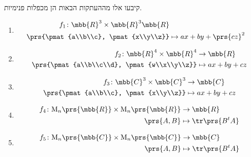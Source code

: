 \documentclass[a4paper,10pt,twoside,openany]{book}
\renewcommand{\Mat}{\mathrm{M}}
\begin{document}
\begin{exercisechap}
קיבעו אלו מההעתקות הבאות הן מכפלות פנימיות.

\begin{enumerate}
\item
\begin{align*}
f_1 \colon \mbb{R}^3 \times \mbb{R}^3 \mbb{R} \\
\prs{\pmat{a\\b\\c}, \pmat{x\\y\\z}} &\mapsto ax + by + \prs{cz}^2
\end{align*}

\item
\begin{align*}
f_2 \colon \mbb{R}^4 \times \mbb{R}^4 &\to \mbb{R} \\
\prs{\pmat{a\\b\\c\\d}, \pmat{w\\x\\y\\z}} &\mapsto ax + by + cz 
\end{align*}

\item
\begin{align*}
f_3 \colon \mbb{C}^3 \times \mbb{C}^3 &\to \mbb{C} \\
\prs{\pmat{a\\b\\c}, \pmat{x\\y\\z}} &\mapsto ax + by + cz
\end{align*}

\item
\begin{align*}
f_4 \colon \Mat_n\prs{\mbb{R}} \times \Mat_n\prs{\mbb{R}} &\to \mbb{R} \\
\prs{A,B} &\mapsto \tr\prs{B^t A}
\end{align*}

\item
\begin{align*}
f_5 \colon \Mat_n\prs{\mbb{C}} \times \Mat_n\prs{\mbb{C}} &\to \mbb{C} \\
\prs{A,B} &\mapsto \tr\prs{B^t A}
\end{align*}
\end{enumerate}
\end{exercisechap}
\end{document}
